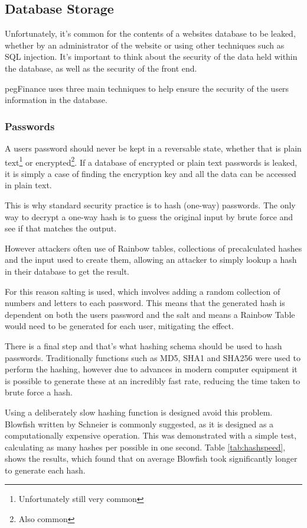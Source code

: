 \subsection{Database Storage}
Unfortunately, it's common for the contents of a websites database to be leaked, whether by an administrator of the website or using other techniques such as SQL injection. It's important to think about the security of the data held within the database, as well as the security of the front end.

pegFinance uses three main techniques to help ensure the security of the users information in the database.

\subsubsection{Passwords}
A users password should never be kept in a reversable state, whether that is plain text\footnote{Unfortunately still very common} or encrypted\footnote{Also common}. If a database of encrypted or plain text passwords is leaked, it is simply a case of finding the encryption key and all the data can be accessed in plain text.

This is why standard security practice is to hash (one-way) passwords. The only way to decrypt a one-way hash is to guess the original input by brute force and see if that matches the output.

However attackers often use of Rainbow tables, collections of precalculated hashes and the input used to create them, allowing an attacker to simply lookup a hash in their database to get the result.

For this reason salting is used, which involves adding a random collection of numbers and letters to each password. This means that the generated hash is dependent on both the users password and the salt and means a Rainbow Table would need to be generated for each user, mitigating the effect.

There is a final step and that's what hashing schema should be used to hash passwords. Traditionally functions such as MD5, SHA1 and SHA256 were used to perform the hashing, however due to advances in modern computer equipment it is possible to generate these at an incredibly fast rate, reducing the time taken to brute force a hash.

Using a deliberately slow hashing function is designed avoid this problem. Blowfish written by Schneier is commonly suggested, as it is designed as a computationally expensive operation. This was demonstrated with a simple test, calculating as many hashes per possible in one second. Table \ref{tab:hashspeed}, shows the results, which found that on average Blowfish took significantly longer to generate each hash.

